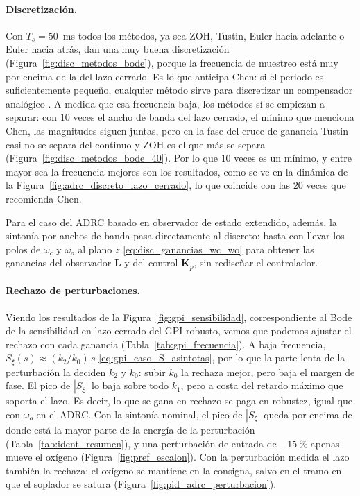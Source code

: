 \paragraph{Discretización.} Con $T_s = 50$~ms todos los métodos, ya sea ZOH, Tustin, Euler hacia
adelante o Euler hacia atrás, dan una muy buena discretización (Figura~\ref{fig:disc_metodos_bode}),
porque la frecuencia de muestreo está muy por encima de la del lazo cerrado. Es lo que anticipa Chen:
si el periodo es suficientemente pequeño, cualquier método sirve para discretizar un compensador
analógico \cite[sec.~13.3.1]{chen1993analog}. A medida que esa frecuencia baja, los métodos sí se
empiezan a separar: con $10$ veces el ancho de banda del lazo cerrado, el mínimo que menciona Chen, las
magnitudes siguen juntas, pero en la fase del cruce de ganancia Tustin casi no se separa del continuo y
ZOH es el que más se separa (Figura~\ref{fig:disc_metodos_bode_40}). Por lo que $10$ veces es un
mínimo, y entre mayor sea la frecuencia mejores son los resultados, como se ve en la dinámica de la
Figura~\ref{fig:adrc_discreto_lazo_cerrado}, lo que coincide con las $20$ veces que recomienda Chen.

Para el caso del ADRC basado en observador de estado extendido, además, la sintonía por anchos de
banda pasa directamente al discreto: basta con llevar los polos de $\omega_c$ y $\omega_o$ al plano $z$
\eqref{eq:disc_ganancias_wc_wo} para obtener las ganancias del observador $\mathbf{L}$ y del control
$\mathbf{K}_p$, sin rediseñar el controlador.

\paragraph{Rechazo de perturbaciones.} Viendo los resultados de la Figura~\ref{fig:gpi_sensibilidad},
correspondiente al Bode de la sensibilidad en lazo cerrado del GPI robusto, vemos que podemos ajustar el
rechazo con cada ganancia (Tabla~\ref{tab:gpi_frecuencia}). A baja frecuencia,
$S_{\xi}(s) \approx (k_2/k_0)\,s$ \eqref{eq:gpi_caso_S_asintotas}, por lo que la parte lenta de la
perturbación la deciden $k_2$ y $k_0$: subir $k_0$ la rechaza mejor, pero baja el margen de fase. El
pico de $|S_{\xi}|$ lo baja sobre todo $k_1$, pero a costa del retardo máximo que soporta el lazo. Es
decir, lo que se gana en rechazo se paga en robustez, igual que con $\omega_o$ en el ADRC. Con la
sintonía nominal, el pico de $|S_{\xi}|$ queda por encima de donde está la mayor parte de la energía de
la perturbación (Tabla~\ref{tab:ident_resumen}), y una perturbación de entrada de $-15~\%$ apenas mueve
el oxígeno (Figura~\ref{fig:pref_escalon}). Con la perturbación medida el lazo también la rechaza:
el oxígeno se mantiene en la consigna, salvo en el tramo en que el soplador se satura
(Figura~\ref{fig:pid_adrc_perturbacion}).

